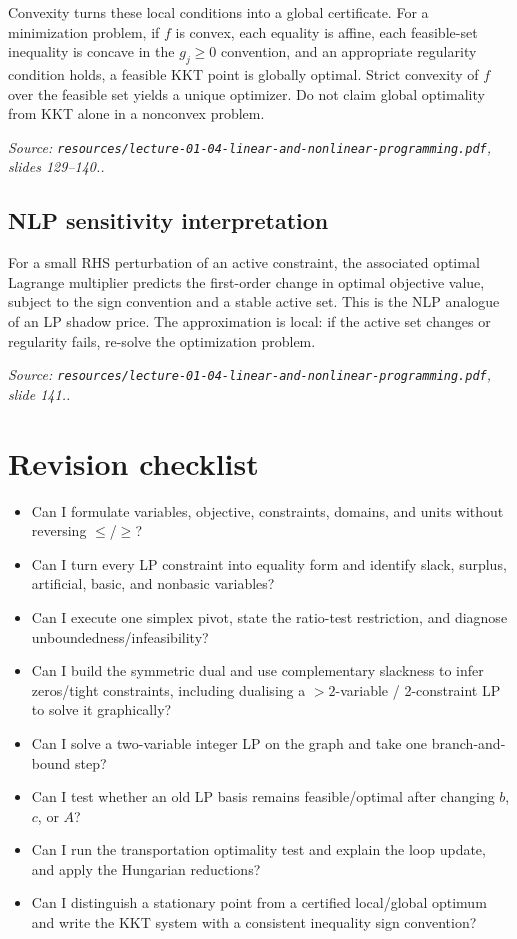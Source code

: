 \documentclass[11pt,a4paper]{article}
\renewcommand{\texttt}[1]{\nolinkurl{#1}}
\newcommand{\source}[1]{\par\smallskip\noindent\textit{Source: #1.}\par\smallskip}
\begin{document}
Convexity turns these local conditions into a global certificate. For a minimization problem, if $f$ is convex, each equality is affine, each feasible-set inequality is concave in the $g_j\geq0$ convention, and an appropriate regularity condition holds, a feasible KKT point is globally optimal. Strict convexity of $f$ over the feasible set yields a unique optimizer. Do not claim global optimality from KKT alone in a nonconvex problem.
\source{\texttt{resources/lecture-01-04-linear-and-nonlinear-programming.pdf}, slides 129--140.}

\subsection{NLP sensitivity interpretation}
For a small RHS perturbation of an active constraint, the associated optimal Lagrange multiplier predicts the first-order change in optimal objective value, subject to the sign convention and a stable active set. This is the NLP analogue of an LP shadow price. The approximation is local: if the active set changes or regularity fails, re-solve the optimization problem.
\source{\texttt{resources/lecture-01-04-linear-and-nonlinear-programming.pdf}, slide 141.}

\section{Revision checklist}
\begin{itemize}
 \item Can I formulate variables, objective, constraints, domains, and units without reversing $\leq$/$\geq$?
 \item Can I turn every LP constraint into equality form and identify slack, surplus, artificial, basic, and nonbasic variables?
 \item Can I execute one simplex pivot, state the ratio-test restriction, and diagnose unboundedness/infeasibility?
 \item Can I build the symmetric dual and use complementary slackness to infer zeros/tight constraints, including dualising a $>2$-variable / 2-constraint LP to solve it graphically?
 \item Can I solve a two-variable integer LP on the graph and take one branch-and-bound step?
 \item Can I test whether an old LP basis remains feasible/optimal after changing $b$, $c$, or $A$?
 \item Can I run the transportation optimality test and explain the loop update, and apply the Hungarian reductions?
 \item Can I distinguish a stationary point from a certified local/global optimum and write the KKT system with a consistent inequality sign convention?
\end{itemize}
\end{document}
